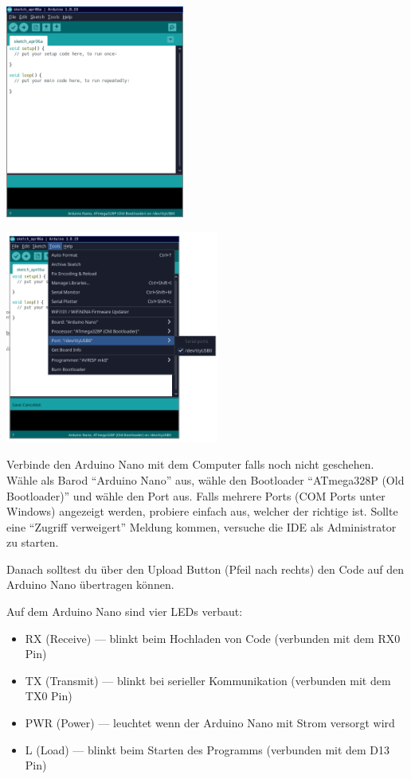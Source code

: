 \documentclass[a4paper,12pt]{book}
\begin{document}
\begin{minipage}{.5\textwidth}
\begin{center}
\includegraphics[height=7cm]{images/ide.png}%
\end{center}
\end{minipage}
\begin{minipage}{.5\textwidth}
\begin{center}
\includegraphics[height=7cm]{images/ide_port.png}
\end{center}
\end{minipage}

Verbinde den Arduino Nano mit dem Computer falls noch nicht geschehen.
Wähle als Barod \enquote{Arduino Nano} aus, wähle den Bootloader \enquote{ATmega328P (Old Bootloader)} und wähle den Port aus.
Falls mehrere Ports (COM Ports unter Windows) angezeigt werden, probiere einfach aus, welcher der richtige ist.
Sollte eine \enquote{Zugriff verweigert} Meldung kommen, versuche die IDE als Administrator zu starten.

Danach solltest du über den Upload Button (Pfeil nach rechts) den Code auf den Arduino Nano übertragen können.

Auf dem Arduino Nano sind vier LEDs verbaut:
\begin{itemize}
  \item RX (Receive) --- blinkt beim Hochladen von Code (verbunden mit dem RX0 Pin)
  \item TX (Transmit) --- blinkt bei serieller Kommunikation (verbunden mit dem TX0 Pin)
  \item PWR (Power) --- leuchtet wenn der Arduino Nano mit Strom versorgt wird
  \item L (Load) --- blinkt beim Starten des Programms (verbunden mit dem D13 Pin)
\end{itemize}
\end{document}
